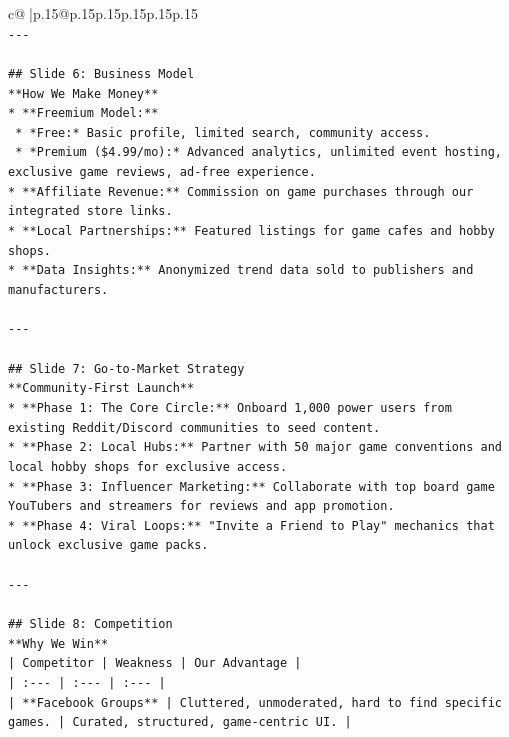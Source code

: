 \documentclass{article}
\begin{document}
{\begin{supertabular}{c@{$\;$}|p{.15\linewidth}@{}p{.15\linewidth}p{.15\linewidth}p{.15\linewidth}p{.15\linewidth}p{.15\linewidth}}
{{{\\ 
\texttt{{-}{-}{-}} \\
\\ 
\texttt{\#\# Slide 6: Business Model} \\
\texttt{**How We Make Money**} \\
\texttt{*   **Freemium Model:**} \\
\texttt{    *   *Free:* Basic profile, limited search, community access.} \\
\texttt{    *   *Premium (\$4.99/mo):* Advanced analytics, unlimited event hosting, exclusive game reviews, ad{-}free experience.} \\
\texttt{*   **Affiliate Revenue:** Commission on game purchases through our integrated store links.} \\
\texttt{*   **Local Partnerships:** Featured listings for game cafes and hobby shops.} \\
\texttt{*   **Data Insights:** Anonymized trend data sold to publishers and manufacturers.} \\
\\ 
\texttt{{-}{-}{-}} \\
\\ 
\texttt{\#\# Slide 7: Go{-}to{-}Market Strategy} \\
\texttt{**Community{-}First Launch**} \\
\texttt{*   **Phase 1: The Core Circle:** Onboard 1,000 power users from existing Reddit/Discord communities to seed content.} \\
\texttt{*   **Phase 2: Local Hubs:** Partner with 50 major game conventions and local hobby shops for exclusive access.} \\
\texttt{*   **Phase 3: Influencer Marketing:** Collaborate with top board game YouTubers and streamers for reviews and app promotion.} \\
\texttt{*   **Phase 4: Viral Loops:** "Invite a Friend to Play" mechanics that unlock exclusive game packs.} \\
\\ 
\texttt{{-}{-}{-}} \\
\\ 
\texttt{\#\# Slide 8: Competition} \\
\texttt{**Why We Win**} \\
\texttt{| Competitor | Weakness | Our Advantage |} \\
\texttt{| :{-}{-}{-} | :{-}{-}{-} | :{-}{-}{-} |} \\
\texttt{| **Facebook Groups** | Cluttered, unmoderated, hard to find specific games. | Curated, structured, game{-}centric UI. |} \\
}}}
\end{supertabular}}
\end{document}
